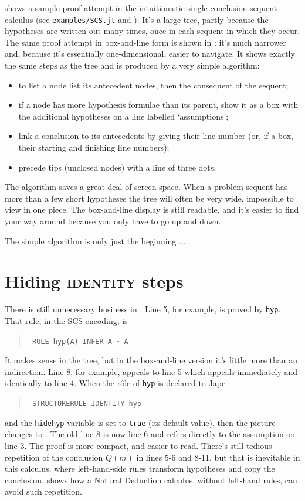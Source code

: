  shows a sample proof attempt in the intuitionistic single-conclusion sequent calculus (see \texttt{examples/SCS.jt} and ). It's a large tree, partly because the hypotheses are written out many times, once in each sequent in which they occur. The same proof attempt in box-and-line form is shown in : it's much narrower and, because it's essentially one-dimensional, easier to navigate. It shows exactly the same steps as the tree and is produced by a very simple algorithm: 
\begin{itemize}
\item to list a node list its antecedent nodes, then the consequent of the sequent;
\item if a node has more hypothesis formulae than its parent, show it as a box with the additional hypotheses on a line labelled `assumptions';
\item link a conclusion to its antecedents by giving their line number (or, if a box, their starting and finishing line numbers);
\item precede tips (unclosed nodes) with a line of three dots.
\end{itemize}
The algorithm saves a great deal of screen space. When a problem sequent has more than a few short hypotheses the tree will often be very wide, impossible to view in one piece. The box-and-line display is still readable, and it's easier to find your way around because you only have to go up and down.

The simple algorithm is only just the beginning ...

\section{Hiding \textsc{identity} steps}

There is still unnecessary business in . Line 5, for example, is proved by \texttt{hyp}. That rule, in the SCS encoding, is
\begin{quote}\tt\small
RULE hyp(A) INFER A ⊦ A
\end{quote}
It makes sense in the tree, but in the box-and-line version it's little more than an indirection. Line 8, for example, appeals to line 5 which appeals immediately and identically to line 4. When the r\^{o}le of \texttt{hyp} is declared to Jape
\begin{quote}\tt\small
STRUCTURERULE IDENTITY hyp
\end{quote}
and the \texttt{hidehyp} variable is set to \texttt{true} (its default value), then the picture changes to . The old line 8 is now line 6 and refers directly to the assumption on line 3. The proof is more compact, and easier to read. There's still tedious repetition of the conclusion $Q(m)$ in lines 5-6 and 8-11, but that is inevitable in this calculus, where left-hand-side rules transform hypotheses and copy the conclusion.  shows how a Natural Deduction calculus, without left-hand rules, can avoid such repetition.

